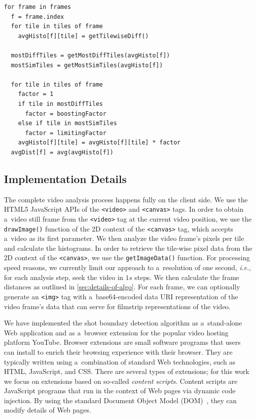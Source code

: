 \begin{lstlisting}[caption=Pseudocode of the shot boundary detection
  algorithm,
  label=code:algorithm, float]
for frame in frames
  f = frame.index  
  for tile in tiles of frame      
    avgHisto[f][tile] = getTilewiseDiff()
 
  mostDiffTiles = getMostDiffTiles(avgHisto[f])
  mostSimTiles = getMostSimTiles(avgHisto[f])
 
  for tile in tiles of frame    
    factor = 1  
    if tile in mostDiffTiles
      factor = boostingFactor
    else if tile in mostSimTiles
      factor = limitingFactor
    avgHisto[f][tile] = avgHisto[f][tile] * factor
  avgDist[f] = avg(avgHisto[f])
\end{lstlisting}

\subsection{Implementation Details}
\label{sec:implementation}

The complete video analysis process happens fully
on the client side.
We use the HTML5 JavaScript APIs of the \texttt{<video>} and
\texttt{<canvas>} tags.
In order to obtain a~video still frame
from the \texttt{<video>} tag at the current video position,
we use the \texttt{drawImage()} function of the 2D context of the
\texttt{<canvas>} tag,
which accepts a~video as its first parameter.
We then analyze the video frame's pixels per tile
and calculate the histograms.
In order to retrieve the tile-wise pixel data
from the 2D context of the \texttt{<canvas>},
we use the \texttt{getImageData()} function.
For processing speed reasons, we currently limit our approach to
a~resolution of one second, \emph{i.e.},
for each analysis step,
seek the video in $\mathit{1s}$ steps.
We then calculate the frame distances as outlined in
\autoref{sec:details-of-algo}.
For each frame, we can optionally generate an \texttt{<img>} tag
with a~base64-encoded data URI representation
of the video frame's data
that can serve for filmstrip representations of the video.

We have implemented the shot boundary detection algorithm
as a~stand-alone Web application and as a~browser extension
for the popular video hosting platform YouTube.
Browser extensions are small software programs that users can install
to enrich their browsing experience with their browser.
They are typically written using a~combination of standard Web technologies,
such as HTML, JavaScript, and CSS.
There are several types of extensions; for this work
we focus on extensions based on so-called \emph{content scripts}.
Content scripts are JavaScript programs that run in the context of Web pages
via dynamic code injection.
By using the standard Document Object Model (DOM)~\cite{lehors2004dom},
they can modify details of Web pages.

